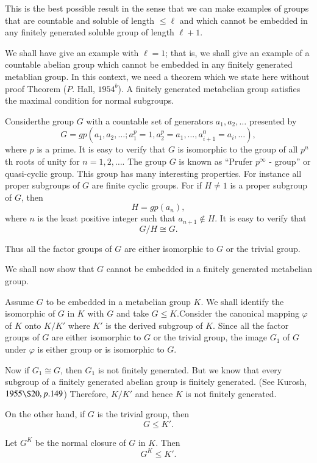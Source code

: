  
 This is the best possible result in the sense that we can make
 examples of groups that are countable and soluble of length $\le
 \ell$ and which cannot be embedded in any finitely generated soluble
 group of length $\ell +1$. 

 We shall have give an example with $\ell = 1$; that is, we shall give
 an example of a countable abelian group which cannot be embedded in
 any finitely generated metablian group. In this context, we need a
 theorem which we state here without proof Theorem ($P$. Hall,
 $1954^b$). A finitely generated metabelian group satisfies the
 maximal condition for normal subgroups. 

 Consider\pageoriginale the group $G$ with a
 countable set of generators $a_1,a_2,\ldots$ presented by 
 $$
 G = gp (a_1, a_2, \ldots ; a^p_1 = 1, a^p_2 = a_1, \ldots, a^0_{i+1}
 = a_i, \ldots), 
 $$
 where $p$ is a prime. It is easy to verify that $G$ is isomorphic to
 the group of all $p^n$ th roots of unity for $n = 1,2, \ldots$. The
 group $G$ is known as ``Prufer $p^\infty$ - group'' or quasi-cyclic
 group. This group has many interesting properties. For instance all
 proper subgroups of $G$ are finite cyclic groups. For if $H \neq 1$
 is a proper subgroup of $G$, then 
 $$
 H = gp (a_n),
 $$
 where $n$ is the least positive integer such that $a_{n+1} \notin
 H$. It is easy to verify that 
 $$
 G/H \cong G.
 $$
 
 Thus all the factor groups of $G$ are either isomorphic to $G$ or the
 trivial group.  

 We shall now show that $G$ cannot be embedded in a finitely generated
 metabelian group.  

 Assume $G$ to be embedded in a metabelian group $K$. We shall
 identify the isomorphic of $G$ in $K$ with $G$ and take $G \le
 K$.\pageoriginale Consider the canonical mapping $\varphi$ of $K$ onto $K/K'$ where
 $K'$ is the derived subgroup of $K$. Since all the factor groups of
 $G$ are either isomorphic to $G$ or the trivial group, the image
 $G_1$ of $G$ under $\varphi$ is either group or is isomorphic to
 $G$. 

 Now if $G_1 \cong G$, then $G_1$ is not finitely generated. But we
 know that every subgroup of a finitely generated abelian group is
 finitely generated. (See Kurosh, $1955 \S 20, p.149$) Therefore,
 $K/K'$ and hence $K$ is not finitely generated. 

 On the other hand, if $G$ is the trivial group, then
 $$
 G \le K'.
 $$

 Let $G^K$ be the normal closure of $G$ in $K$. Then
 $$
 G^K \le K'.
 $$

